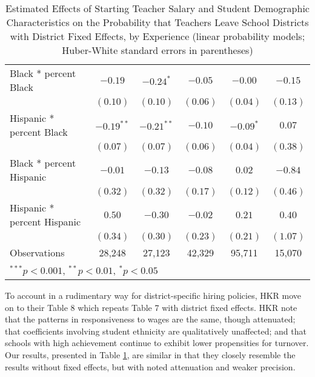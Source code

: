 \documentclass[]{article}
\begin{document}
\begin{table}
\begin{center}
\begin{tabular}{l c c c c c }
\quad Black * percent Black                 & $-0.19$      & $-0.24^{*}$  & $-0.05$      & $-0.00$     & $-0.15$      \\
                                            & $(0.10)$     & $(0.10)$     & $(0.06)$     & $(0.04)$    & $(0.13)$     \\
\quad Hispanic * percent Black              & $-0.19^{**}$ & $-0.21^{**}$ & $-0.10$      & $-0.09^{*}$ & $0.07$       \\
                                            & $(0.07)$     & $(0.07)$     & $(0.06)$     & $(0.04)$    & $(0.38)$     \\
\quad Black * percent Hispanic              & $-0.01$      & $-0.13$      & $-0.08$      & $0.02$      & $-0.84$      \\
                                            & $(0.32)$     & $(0.32)$     & $(0.17)$     & $(0.12)$    & $(0.46)$     \\
\quad Hispanic * percent Hispanic           & $0.50$       & $-0.30$      & $-0.02$      & $0.21$      & $0.40$       \\
                                            & $(0.34)$     & $(0.30)$     & $(0.23)$     & $(0.21)$    & $(1.07)$     \\
\hline
Observations                                & 28,248        & 27,123        & 42,329        & 95,711       & 15,070        \\
\hline
\multicolumn{6}{l}{\scriptsize{$^{***}p<0.001$, $^{**}p<0.01$, $^*p<0.05$}}
\end{tabular}
\caption{Estimated Effects of Starting Teacher Salary and Student Demographic Characteristics on the Probability that Teachers Leave School Districts with District Fixed Effects, by Experience (linear probability models; Huber-White standard errors in parentheses)}
\label{tbl:reg_lpm_fe}
\end{center}
\end{table}

To account in a rudimentary way for district-specific hiring policies,
HKR move on to their Table 8 which repeats Table 7 with district fixed
effects. HKR note that the patterns in responsiveness to wages are the
same, though attenuated; that coefficients involving student ethnicity
are qualitatively unaffected; and that schools with high achievement
continue to exhibit lower propensities for turnover. Our results,
presented in Table \ref{tbl:reg_lpm_fe}, are similar in that they
closely resemble the results without fixed effects, but with noted
attenuation and weaker precision.
\end{document}
